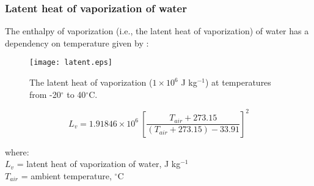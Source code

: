 \subsubsection{Latent heat of vaporization of water}
\label{sec:latent}
The enthalpy of vaporization (i.e., the latent heat of vaporization) of water has a dependency on temperature given by \parencite[Eq. 8]{henderson84}:

\begin{figure}[ht!]
    \texttt{[image: latent.eps]}
    \caption{The latent heat of vaporization ($1\times 10^6$ J kg$^{-1}$) at temperatures from -20$^{\circ}$ to 40$^{\circ}$C.}
    \label{fig:latent}
\end{figure}

\begin{equation}
\label{eq:latent}
	L_v = 1.91846\times 10^6\: \left[
		\frac{T_{air} + 273.15}{\left(T_{air} + 273.15\right) - 33.91}
	\right]^2
\end{equation}

\noindent where: \\
\indent $L_v$ = latent heat of vaporization of water, J kg$^{-1}$\\
\indent $T_{air}$ = ambient temperature, $^{\circ}$C\\

